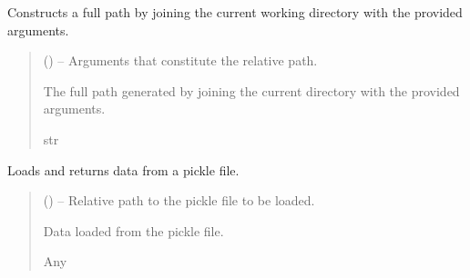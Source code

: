 \documentclass[letterpaper,10pt,english]{sphinxmanual}
\begin{document}

\begin{fulllineitems}
\label{\detokenize{fspsim.utils:fspsim.utils.SpaceCatalogue.get_path}}
\pysigstartsignatures
{}
\pysigstopsignatures
\sphinxAtStartPar
Constructs a full path by joining the current working directory with the provided arguments.
\begin{quote}\begin{description}
\sphinxAtStartPar
{} () – Arguments that constitute the relative path.

\sphinxAtStartPar
The full path generated by joining the current directory with the provided arguments.

\sphinxAtStartPar
str

\end{description}\end{quote}

\end{fulllineitems}


\begin{fulllineitems}
\label{\detokenize{fspsim.utils:fspsim.utils.SpaceCatalogue.load_pickle}}
\pysigstartsignatures
{}
\pysigstopsignatures
\sphinxAtStartPar
Loads and returns data from a pickle file.
\begin{quote}\begin{description}
\sphinxAtStartPar
{} () – Relative path to the pickle file to be loaded.

\sphinxAtStartPar
Data loaded from the pickle file.

\sphinxAtStartPar
Any

\end{description}\end{quote}

\end{fulllineitems}
\end{document}
